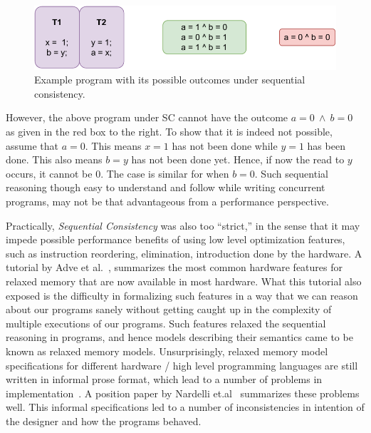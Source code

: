 \begin{figure}[H]
    \centering
    \includegraphics[scale=0.7]{2.Background/SC_Example1(a).pdf}
    \caption{Example program with its possible outcomes under sequential consistency.}
    \label{intro:Example}
\end{figure}

However, the above program under SC cannot have the outcome $a=0\ \wedge\ b=0$ as given in the red box to the right. To show that it is indeed not possible, assume that $a=0$. This means $x=1$ has not been done while $y=1$ has been done. This also means $b=y$ has not been done yet. Hence, if now the read to $y$ occurs, it cannot be $0$. The case is similar for when $b=0$. 
Such sequential reasoning though easy to understand and follow while writing concurrent programs, may not be that advantageous from a performance perspective.

Practically, \textit{Sequential Consistency} was also too ``strict,'' in the sense that it may impede possible performance benefits of using low level optimization features, such as instruction reordering, elimination, introduction done by the hardware.
A tutorial by Adve et al.~\cite{AdveG}, summarizes the most common hardware features for relaxed memory that are now available in most hardware. 
What this tutorial also exposed is the difficulty in formalizing such features in a way that we can reason about our programs sanely without getting caught up in the complexity of multiple executions of our programs. 
Such features relaxed the sequential reasoning in programs, and hence models describing their semantics came to be known as relaxed memory models.
Unsurprisingly, relaxed memory model specifications for different hardware / high level programming languages are still written in informal prose format, which lead to a number of problems in implementation~\cite{Sewell}. 
A position paper by Nardelli et.al~\cite{Nardelli} summarizes these problems well.
This informal specifications led to a number of inconsistencies in intention of the designer and how the programs behaved.

